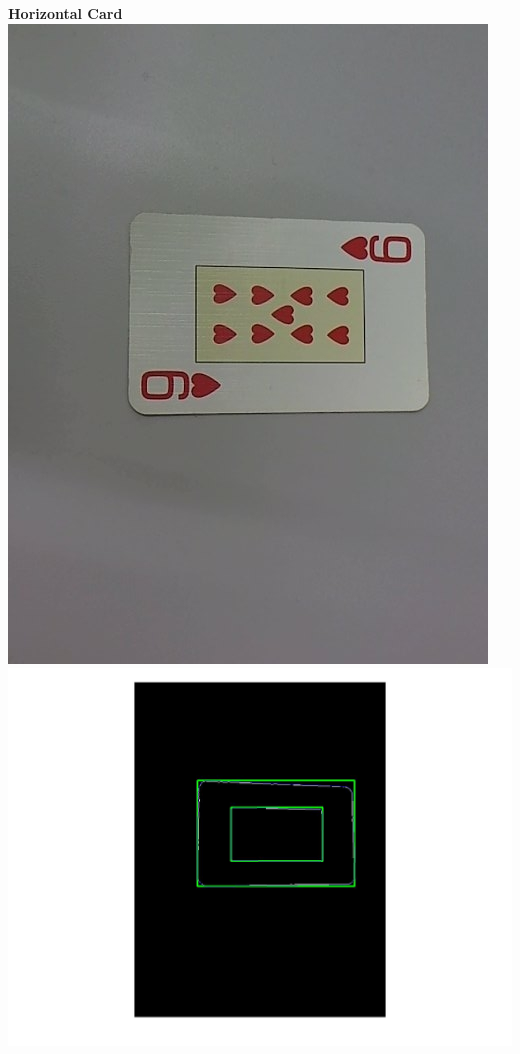 \documentclass[11pt]{article}
\theoremstyle{plain}
\theoremstyle{definition}
\begin{document}
  \newline
 {\bf Horizontal Card}
 \newline
 \includegraphics[scale=0.1]{test2_90.jpg}
  \includegraphics[scale=0.07]{rotated_main.jpg}
\end{document}
